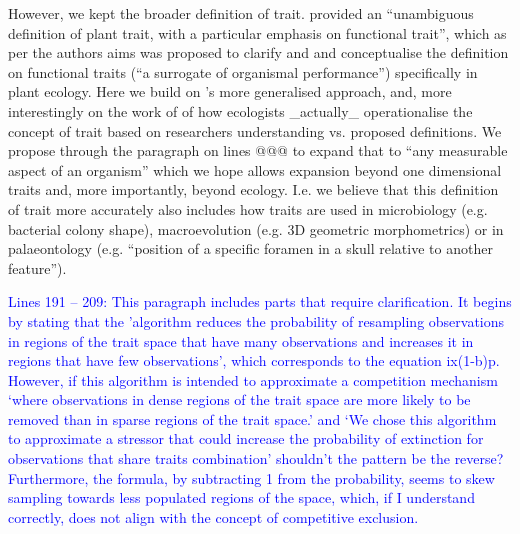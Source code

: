 \documentclass[
]{article}
\begin{document}
However, we kept the broader definition of trait.
\citealt{violle2007let} provided an ``unambiguous definition of plant trait, with a particular emphasis on functional trait'', which as per the authors aims was proposed to clarify and and conceptualise the definition on functional traits (``a surrogate of organismal performance'') specifically in plant ecology.
Here we build on \citealt{mcgill2006rebuilding}'s more generalised approach, and, more interestingly on the work of \citealt{dawson2021traits} of how ecologists _actually_ operationalise the concept of trait based on researchers understanding vs. proposed definitions.
We propose through the paragraph on lines @@@ to expand that to ``any measurable aspect of an organism'' which we hope allows expansion beyond one dimensional traits and, more importantly, beyond ecology.
I.e. we believe that this definition of trait more accurately also includes how traits are used in microbiology (e.g. bacterial colony shape), macroevolution (e.g. 3D geometric morphometrics) or in palaeontology (e.g. ``position of a specific foramen in a skull relative to another feature'').

 
\textcolor{blue}{Lines 191 – 209: This paragraph includes parts that require clarification.
It begins by stating that the 'algorithm reduces the probability of resampling observations in regions of the trait space that have many observations and increases it in regions that have few observations', which corresponds to the equation ix(1-b)p.
However, if this algorithm is intended to approximate a competition mechanism ‘where observations in dense regions of the trait space are more likely to be removed than in sparse regions of the trait space.’ and ‘We chose this algorithm to approximate a stressor that could increase the probability of extinction for observations that share traits combination’ shouldn’t the pattern be the reverse?
Furthermore, the formula, by subtracting 1 from the probability, seems to skew sampling towards less populated regions of the space, which, if I understand correctly, does not align with the concept of competitive exclusion.}

\end{document}
